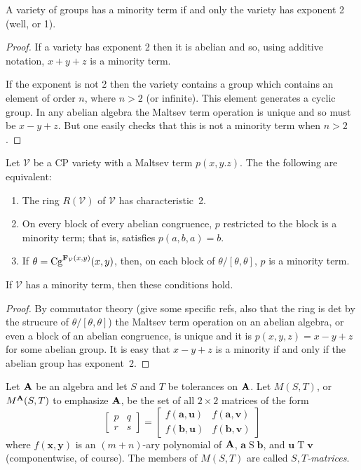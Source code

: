 \begin{fact}
A variety of groups has a minority term if and only
the variety has exponent 2 (well, or 1).
\end{fact}

\begin{proof}
If a variety has exponent 2 then it is abelian and so,
using additive notation, $x + y + z$ is a minority term.

If the exponent is not 2 then the variety contains a group
which contains an element of order $n$, where $n > 2$ (or 
infinite). This element generates a cyclic group. In any
abelian algebra the Maltsev term operation is unique and so
must be $x - y + z$. But one easily checks that this is not
a minority term when $n > 2$.
\end{proof}

\begin{lemma}
Let $\mathcal V$ be a CP variety with a Maltsev term $p(x,y.z)$.
The the following are equivalent:
\begin{enumerate}
\item
The ring $R(\mathcal V)$ of $\mathcal V$ has characteristic~2.
\item
On every block of every abelian congruence, $p$ restricted to the 
block is a minority term; that is, satisfies $p(a,b,a) = b$.
\item
If $\theta = \textup{Cg}^{\mathbf{F}_{\mathcal V}(x,y)}(x,y)$, then,
on each block of $\theta/[\theta,\theta]$, $p$ is a minority term.
\end{enumerate}
If $\mathcal V$ has a minority term, then these conditions hold.
\end{lemma}

\begin{proof}
By commutator theory (give some specific refs, also that the ring
is det by the strucure of $\theta/[\theta,\theta]$) 
the Maltsev term operation on an
abelian algebra, or even a block of an abelian congruence, 
is unique and it is $p(x,y,z) = x - y + z$ for
some abelian group. It is easy that $x - y + z$ is a minority
if and only if the abelian group has exponent~2.
\end{proof}





Let $\mathbf{A}$ be an algebra and let $S$ and $T$ be tolerances
on $\mathbf{A}$. 
Let $M(S,T)$, or $M^{\mathbf{A}}(S,T)$ to emphasize $\mathbf{A}$,
be the set of all $2 \times 2$ matrices of the form
\begin{equation}\label{eq1}
\begin{bmatrix}
p&q\\
r&s
\end{bmatrix}
=
\begin{bmatrix}
f(\mathbf{a},\mathbf{u})&f(\mathbf{a},\mathbf{v})\\
f(\mathbf{b},\mathbf{u})&f(\mathbf{b},\mathbf{v})
\end{bmatrix}
\end{equation}
where $f(\mathbf{x},\mathbf{y})$ is an $(m+n)$-ary polynomial of
$\mathbf{A}$, $\mathbf{a} \mathrel{S} \mathbf{b}$, and 
$\mathbf{u} \mathrel{T} \mathbf{v}$
(componentwise, of course). The members of $M(S,T)$ are called
\emph{$S,T$-matrices}.

